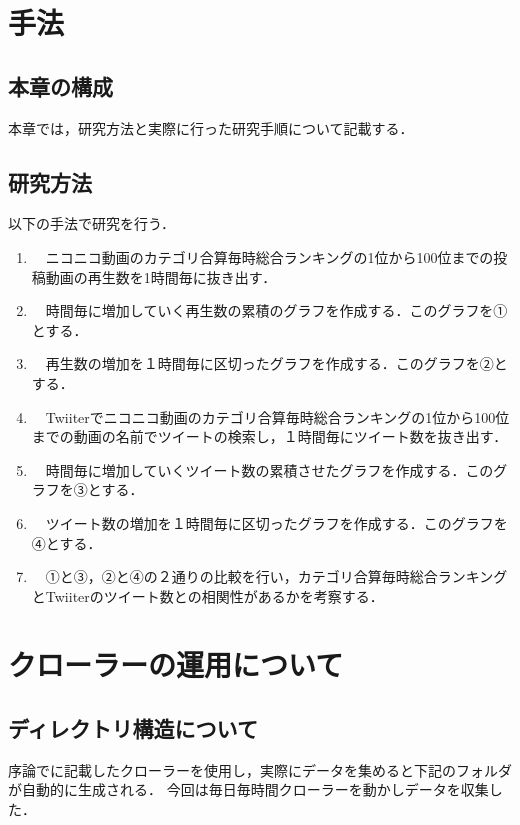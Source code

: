 \chapter{手法}

\section{本章の構成}
本章では，研究方法と実際に行った研究手順について記載する．

\section{研究方法}

以下の手法で研究を行う．

\begin{enumerate}

\item　ニコニコ動画のカテゴリ合算毎時総合ランキングの1位から100位までの投稿動画の再生数を1時間毎に抜き出す．
\item　時間毎に増加していく再生数の累積のグラフを作成する．このグラフを①とする．
\item　再生数の増加を１時間毎に区切ったグラフを作成する．このグラフを②とする．
\item　Twiiterでニコニコ動画のカテゴリ合算毎時総合ランキングの1位から100位までの動画の名前でツイートの検索し，１時間毎にツイート数を抜き出す．
\item　時間毎に増加していくツイート数の累積させたグラフを作成する．このグラフを③とする．
\item　ツイート数の増加を１時間毎に区切ったグラフを作成する．このグラフを④とする．
\item　①と③，②と④の２通りの比較を行い，カテゴリ合算毎時総合ランキングとTwiiterのツイート数との相関性があるかを考察する．

\end{enumerate}


\chapter{クローラーの運用について}

\section{ディレクトリ構造について}

序論でに記載したクローラーを使用し，実際にデータを集めると下記のフォルダが自動的に生成される．
今回は毎日毎時間クローラーを動かしデータを収集した．

